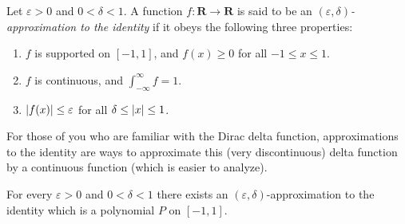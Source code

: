 \begin{definition}\label{3.8.6}
    Let \(\varepsilon > 0\) and \(0 < \delta < 1\).
    A function \(f : \mathbf{R} \to \mathbf{R}\) is said to be an \emph{\((\varepsilon, \delta)\)-approximation to the identity} if it obeys the following three properties:
    \begin{enumerate}
        \item \(f\) is supported on \([-1, 1]\), and \(f(x) \geq 0\) for all \(-1 \leq x \leq 1\).
        \item \(f\) is continuous, and \(\int_{-\infty}^\infty f = 1\).
        \item \(\abs*{f(x)} \leq \varepsilon\) for all \(\delta \leq \abs*{x} \leq 1\).
    \end{enumerate}
\end{definition}

\begin{remark}\label{3.8.7}
    For those of you who are familiar with the Dirac delta function, approximations to the identity are ways to approximate this (very discontinuous) delta function by a continuous function (which is easier to analyze).
\end{remark}

\begin{lemma}\label{3.8.8}
    For every \(\varepsilon > 0\) and \(0 < \delta < 1\) there exists an \((\varepsilon, \delta)\)-approximation to the identity which is a polynomial \(P\) on \([-1, 1]\).
\end{lemma}

